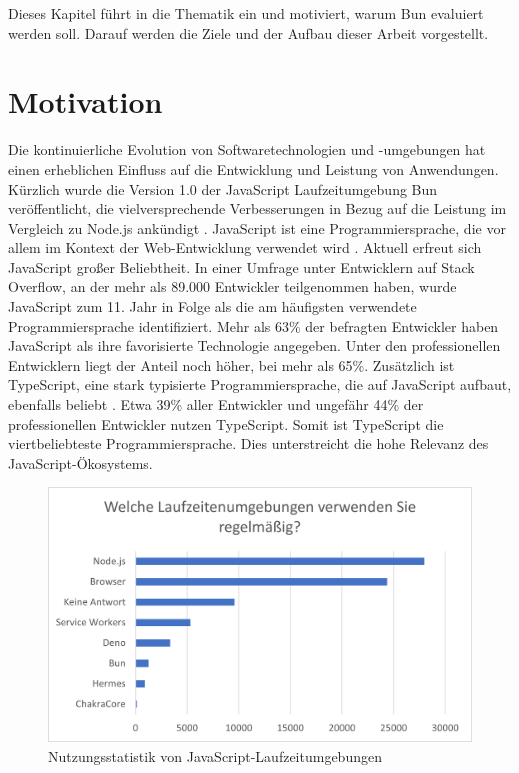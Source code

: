 \pagestyle{fancy-style}
 \label{introduction}
Dieses Kapitel führt in die Thematik ein und motiviert, warum Bun evaluiert werden soll. Darauf werden die Ziele und der Aufbau dieser Arbeit vorgestellt.

\section{Motivation} \label{sec:introduction-motivation}
Die kontinuierliche Evolution von Softwaretechnologien und -umgebungen hat einen erheblichen Einfluss auf die Entwicklung und Leistung von Anwendungen. Kürzlich wurde die Version 1.0 der JavaScript Laufzeitumgebung Bun veröffentlicht, die vielversprechende Verbesserungen in Bezug auf die Leistung im Vergleich zu Node.js ankündigt \cite{Sumner.2023}. \newline
JavaScript ist eine Programmiersprache, die vor allem im Kontext der Web-Entwicklung verwendet wird \cite{Brown.November2019}. Aktuell erfreut sich JavaScript großer Beliebtheit. In einer Umfrage unter Entwicklern auf Stack Overflow, an der mehr als 89.000 Entwickler teilgenommen haben, wurde JavaScript zum 11. Jahr in Folge als die am häufigsten verwendete Programmiersprache identifiziert. Mehr als 63\% der befragten Entwickler haben JavaScript als ihre favorisierte Technologie angegeben. Unter den professionellen Entwicklern liegt der Anteil noch höher, bei mehr als 65\%. Zusätzlich ist TypeScript, eine stark typisierte Programmiersprache, die auf 
JavaScript aufbaut, ebenfalls beliebt \cite{Microsoft.o.J.}. Etwa 39\% aller Entwickler und ungefähr 44\% der professionellen Entwickler nutzen TypeScript. Somit ist TypeScript die viertbeliebteste Programmiersprache. Dies unterstreicht die hohe Relevanz des JavaScript-Ökosystems.\cite{StackOverflow.2023}\\

\begin{figure}[h]
	\centering
	\includegraphics[width=\linewidth]{./images/WhichRuntimesDoYouUseRegularly}
	\caption[Nutzungsstatistik von JavaScript-Laufzeitumgebungen]{Nutzungsstatistik von JavaScript-Laufzeitumgebungen \cite{Greif.2022}}
	\label{fig:runtime-share}
\end{figure}

